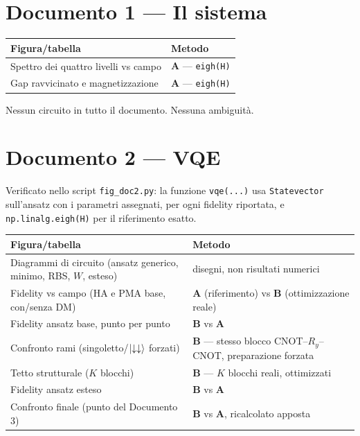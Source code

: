 \documentclass[11pt,a4paper]{article}
\begin{document}
\section{Documento 1 --- Il sistema}

\begin{center}
\renewcommand{\arraystretch}{1.25}
\begin{tabular}{@{}p{}p{}@{}}
\toprule
\rowcolor{grigetto}
\textbf{Figura/tabella} & \textbf{Metodo} \\
\midrule
Spettro dei quattro livelli vs campo & \textbf{A} --- \texttt{eigh(H)} \\
Gap ravvicinato e magnetizzazione & \textbf{A} --- \texttt{eigh(H)} \\
\bottomrule
\end{tabular}
\end{center}

Nessun circuito in tutto il documento. Nessuna ambiguità.

\section{Documento 2 --- VQE}

Verificato nello script \texttt{fig\_doc2.py}: la funzione \texttt{vqe(...)}
usa \texttt{Statevector} sull'ansatz con i parametri assegnati, per ogni
fidelity riportata, e \texttt{np.linalg.eigh(H)} per il riferimento esatto.

\begin{center}
\renewcommand{\arraystretch}{1.25}
\begin{tabular}{@{}p{}p{}@{}}
\toprule
\rowcolor{grigetto}
\textbf{Figura/tabella} & \textbf{Metodo} \\
\midrule
Diagrammi di circuito (ansatz generico, minimo, RBS, $W$, esteso) & disegni, non risultati numerici \\
Fidelity vs campo (HA e PMA base, con/senza DM) & \textbf{A} (riferimento) vs \textbf{B} (ottimizzazione reale) \\
Fidelity ansatz base, punto per punto & \textbf{B} vs \textbf{A} \\
Confronto rami (singoletto/$\lvert \downarrow\downarrow\rangle$ forzati) & \textbf{B} --- stesso blocco CNOT--$R_y$--CNOT, preparazione forzata \\
Tetto strutturale ($K$ blocchi) & \textbf{B} --- $K$ blocchi reali, ottimizzati \\
Fidelity ansatz esteso & \textbf{B} vs \textbf{A} \\
Confronto finale (punto del Documento 3) & \textbf{B} vs \textbf{A}, ricalcolato apposta \\
\bottomrule
\end{tabular}
\end{center}
\end{document}
